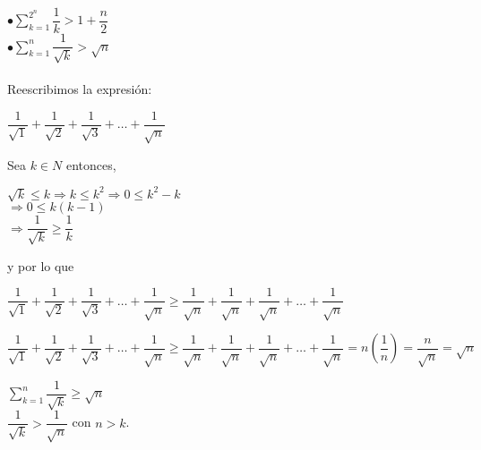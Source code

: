 \documentclass[12pt,a4paper,scrartcl]{article}
\begin{document}
{%
$\bullet\displaystyle
\sum_{k=1}^{2^n}\dfrac{1}{k} > 1+\dfrac{n}{2}$\\





$\bullet\displaystyle
\sum_{k=1}^{n}\dfrac{1}{\sqrt{k}}> \sqrt{n}$\\
\\
Reescribimos la expresi\'on:
\begin{center}
$\dfrac{1}{\sqrt{1}} + \dfrac{1}{\sqrt{2}}+\dfrac{1}{\sqrt{3}}+\ldots+\dfrac{1}{\sqrt{n}}$
\end{center}
Sea $k\in N$ entonces,\\
\begin{center}
$\sqrt{k} \leq k \Rightarrow k\leq k^2 \Rightarrow 0\leq k^2-k$ \\
$\Rightarrow 0 \leq k(k-1)$
\\$\Rightarrow \dfrac{1}{\sqrt{k}} \geq \dfrac{1}{k}$
\end{center}
y por lo que \\

\begin{center}
$\dfrac{1}{\sqrt{1}} + \dfrac{1}{\sqrt{2}}+\dfrac{1}{\sqrt{3}}+\ldots+\dfrac{1}{\sqrt{n}} \geq \dfrac{1}{\sqrt{n}} + \dfrac{1}{\sqrt{n}}+\dfrac{1}{\sqrt{n}}+\ldots+\dfrac{1}{\sqrt{n}}$
\end{center}

\begin{center}
$\dfrac{1}{\sqrt{1}} + \dfrac{1}{\sqrt{2}}+\dfrac{1}{\sqrt{3}}+\ldots+\dfrac{1}{\sqrt{n}} \geq \dfrac{1}{\sqrt{n}} + \dfrac{1}{\sqrt{n}}+\dfrac{1}{\sqrt{n}}+\ldots+\dfrac{1}{\sqrt{n}}= n(\dfrac{1}{n})=\dfrac{n}{\sqrt{n}}=\sqrt{n}$
\end{center}

\begin{center}
$\displaystyle
\sum_{k=1}^{n}\dfrac{1}{\sqrt{k}} \geq \sqrt{n}$  \\ $\dfrac{1}{\sqrt{k}}>\dfrac{1}{\sqrt{n}}$ con $n>k$.
\end{center}




}
\end{document}
